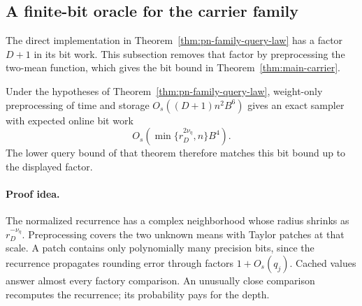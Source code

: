 \subsection{A finite-bit oracle for the carrier family}
\label{sec:pn-family-oracle}

The direct implementation in Theorem~\ref{thm:pn-family-query-law} has
a factor $D+1$ in its bit work. This subsection removes that factor by
preprocessing the two-mean function, which gives the bit bound in
Theorem~\ref{thm:main-carrier}.

\begin{theorem}
\label{thm:pn-family-bit-law}
Under the hypotheses of Theorem~\ref{thm:pn-family-query-law},
weight-only preprocessing of time and storage
$O_s((D+1)n^2B^6)$ gives an exact sampler with expected online
bit work
\[
 O_s\!\left(\min\{r_D^{2\nu_\eta},n\}B^4\right).
\]
The lower query bound of that theorem therefore matches this
bit bound up to the displayed factor.
\end{theorem}

\paragraph{Proof idea.}
The normalized recurrence has a complex neighborhood whose radius
shrinks as $r_D^{-\nu_\eta}$. Preprocessing covers the two unknown
means with Taylor patches at that scale. A patch contains only
polynomially many precision bits, since the recurrence propagates
rounding error through factors $1+O_s(q_j)$. Cached values answer
almost every factory comparison. An unusually close comparison
recomputes the recurrence; its probability pays for the depth.

